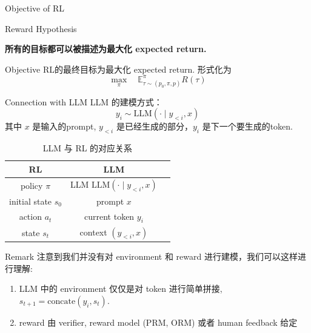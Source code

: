 \documentclass[aspectratio=169]{beamer}
\begin{document}
\begin{frame}{Objective of RL}
    \begin{block}{Reward Hypothesis}
        \begin{center}
        \textbf{所有的目标都可以被描述为最大化 expected return.}
        \end{center}
    \end{block}

    \begin{block}{Objective}
        RL的最终目标为最大化 expected return. 形式化为
        \begin{equation}
            \max_{\pi}\quad \mathbb{E}_{\tau\sim(p_0,\pi, p)}^\pi R(\tau)
        \end{equation}
    \end{block}
\end{frame}

\begin{frame}{Connection with LLM}
    \small
    LLM 的建模方式：
    \begin{equation}
        y_i \sim \mathrm{LLM}(\cdot\mid y_{<i}, x)
    \end{equation}
    其中 $x$ 是输入的prompt, $y_{<i}$ 是已经生成的部分，$y_i$ 是下一个要生成的token.
    \begin{table}[h!]
        \centering
        \caption{LLM 与 RL 的对应关系}
        \begin{tabular}{ccc}
            \toprule
            \textbf{RL} & \textbf{LLM} \\
            \midrule
            policy $\pi$        & LLM $\mathrm{LLM}(\cdot\mid y_{<i}, x)$ \\
            initial state $s_0$ & prompt $x$           \\
            action $a_t$        & current token $y_i$  \\
            state $s_t$         & context $(y_{<i}, x)$ \\
            \bottomrule
        \end{tabular}
    \end{table}
    \begin{block}{Remark}
        注意到我们并没有对 environment 和 reward 进行建模，我们可以这样进行理解:
        \begin{enumerate}
            \item LLM 中的 environment 仅仅是对 token 进行简单拼接, $s_{t+1} = \mathrm{concate}(y_i, s_t)$.
            \item reward 由 verifier, reward model (PRM, ORM) 或者 human feedback 给定
        \end{enumerate}
    \end{block}
\end{frame}
\end{document}
